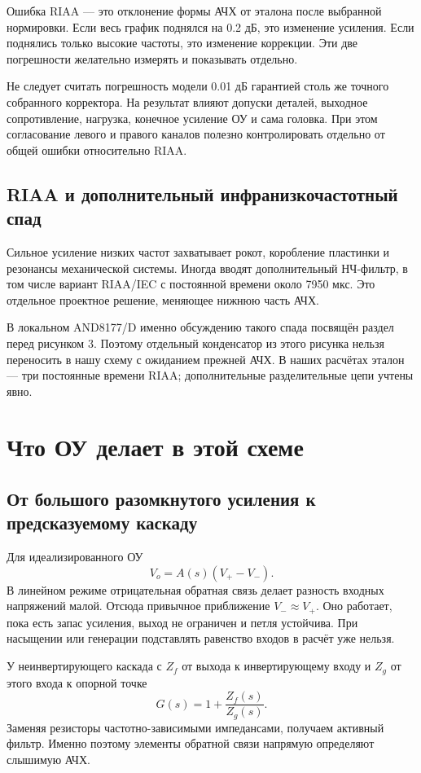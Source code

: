 \documentclass[a4paper,11pt]{article}
\begin{document}
Ошибка RIAA — это отклонение формы АЧХ от эталона после выбранной нормировки.
Если весь график поднялся на 0.2 дБ, это изменение усиления. Если поднялись
только высокие частоты, это изменение коррекции. Эти две погрешности желательно
измерять и показывать отдельно.

Не следует считать погрешность модели 0.01 дБ гарантией столь же точного
собранного корректора. На результат влияют допуски деталей, выходное сопротивление,
нагрузка, конечное усиление ОУ и сама головка. При этом согласование левого
и правого каналов полезно контролировать отдельно от общей ошибки относительно RIAA.

\subsection{RIAA и дополнительный инфранизкочастотный спад}

Сильное усиление низких частот захватывает рокот, коробление пластинки и
резонансы механической системы. Иногда вводят дополнительный НЧ-фильтр,
в том числе вариант RIAA/IEC с постоянной времени около 7950 мкс.
Это отдельное проектное решение, меняющее нижнюю часть АЧХ.

В локальном AND8177/D именно обсуждению такого спада посвящён раздел перед
рисунком 3\cite{onsemi-audio}. Поэтому отдельный конденсатор из этого рисунка
нельзя переносить в нашу схему с ожиданием прежней АЧХ. В наших расчётах эталон —
три постоянные времени RIAA; дополнительные разделительные цепи учтены явно.

\section{Что ОУ делает в этой схеме}

\subsection{От большого разомкнутого усиления к предсказуемому каскаду}

Для идеализированного ОУ
\[
 V_o=A(s)(V_+-V_-).
\]
В линейном режиме отрицательная обратная связь делает разность входных напряжений
малой. Отсюда привычное приближение $V_-\approx V_+$.
Оно работает, пока есть запас усиления, выход не ограничен и петля устойчива.
При насыщении или генерации подставлять равенство входов в расчёт уже нельзя.

У неинвертирующего каскада с $Z_f$ от выхода к инвертирующему входу
и $Z_g$ от этого входа к опорной точке
\[
 G(s)=1+\frac{Z_f(s)}{Z_g(s)}.
\]
Заменяя резисторы частотно-зависимыми импедансами, получаем активный фильтр.
Именно поэтому элементы обратной связи напрямую определяют слышимую АЧХ.
\end{document}
